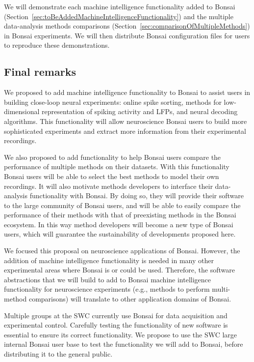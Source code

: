 \documentclass[a4paper,11point]{article}
\begin{document}
We will demonstrate each machine intelligence functionality added to Bonsai
(Section~\ref{sec:toBeAddedMachineIntelligenceFunctionality}) and the multiple
data-analysis methods comparisons
(Section~\ref{sec:comparisonOfMultipleMethods}) in Bonsai experiments. We will
then distribute Bonsai configuration files for users to reproduce these
demonstrations.

\subsection{Final remarks}
\label{sec:finalRemarks}

We proposed to add machine intelligence functionality to Bonsai to assist users
in building close-loop neural experiments: online spike sorting, methods for
low-dimensional representation of spiking activity and LFPs, and neural
decoding algorithms. This functionality will allow neuroscience Bonsai users to
build more sophisticated experiments and extract more information from their
experimental recordings.

We also proposed to add functionality to help Bonsai users compare the
performance of multiple methods on their datasets. With this functionality
Bonsai users will be able to select the best methods to model their own
recordings. It will also motivate methods developers to interface their
data-analysis functionality with Bonsai. By doing so, they will provide their
software to the large community of Bonsai users, and will be able to easily
compare the performance of their methods with that of preexisting methods in
the Bonsai ecosystem. In this way method developers will become a new type of
Bonsai users, which will guarantee the sustainability of developments
proposed here.

We focused this proposal on neuroscience applications of Bonsai. However, the
addition of machine intelligence functionality is needed in many other
experimental areas where Bonsai is or could be used. Therefore, the software
abstractions that we will build to add to Bonsai machine intelligence
functionality for neuroscience experiments (e.g., methods to perform
multi-method comparisons) will translate to other application domains of
Bonsai.

Multiple groups at the SWC currently use Bonsai for data acquisition and
experimental control. Carefully testing the functionality of new software is
essential to ensure its correct functionality. We propose to use the SWC large
internal Bonsai user base to test the functionality we will add to Bonsai,
before distributing it to the general public.
\end{document}
